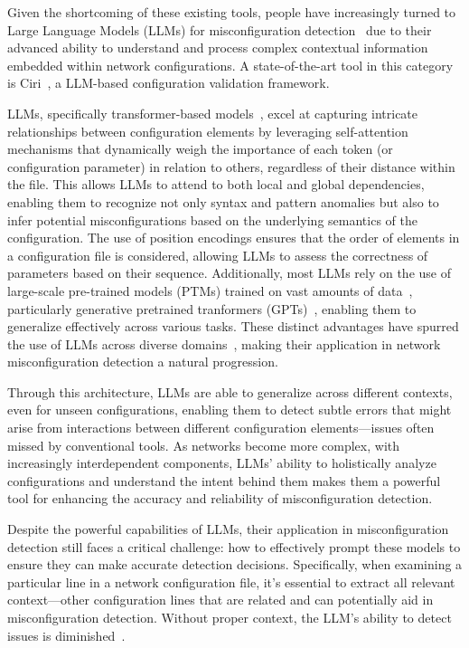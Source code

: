 Given the shortcoming of these existing tools,
people have increasingly turned to Large Language Models (LLMs) for misconfiguration detection~\cite{bogdanov2024leveraging,chen2024automatic,wang2024identifying,liu2024large, wang2024netconfeval} due to their advanced ability to understand and process complex contextual information embedded within network configurations. A state-of-the-art tool in this category is Ciri~\cite{lian2023configuration}, a LLM-based configuration validation framework.

LLMs, specifically transformer-based models~\cite{vaswani2017attention,hill2024transformers,lin2022survey}, excel at capturing intricate relationships between configuration elements by leveraging self-attention mechanisms that dynamically weigh the importance of each token (or configuration parameter) in relation to others, regardless of their distance within the file. This allows LLMs to attend to both local and global dependencies, enabling them to recognize not only syntax and pattern anomalies but also to infer potential misconfigurations based on the underlying semantics of the configuration. The use of position encodings ensures that the order of elements in a configuration file is considered, allowing LLMs to assess the correctness of parameters based on their sequence. Additionally, most LLMs rely on the use of large-scale pre-trained models (PTMs) trained on vast amounts of data~\cite{qiu2020pre}, particularly generative pretrained tranformers (GPTs)~\cite{achiam2023gpt,touvron2023llama,shanahan2024talking,taylor2023galactica,brown2020language,chowdhery2023palm}, enabling them to generalize effectively across various tasks.
These distinct advantages have spurred the use of LLMs across diverse domains~\cite{carion2020end,sheng2019nrtr,neil2020transformers,parmar2018image,chen2021developing,gulati2020conformer}, making their application in network misconfiguration detection a natural progression.

Through this architecture, LLMs are able to generalize across different contexts, even for unseen configurations, enabling them to detect subtle errors that might arise from interactions between different configuration elements—issues often missed by conventional tools. As networks become more complex, with increasingly interdependent components, LLMs' ability to holistically analyze configurations and understand the intent behind them makes them a powerful tool for enhancing the accuracy and reliability of misconfiguration detection.


Despite the powerful capabilities of LLMs, their application in misconfiguration detection still faces a critical challenge: how to effectively prompt these models to ensure they can make accurate detection decisions. Specifically, when examining a particular line in a network configuration file, it’s essential to extract all relevant context—other configuration lines that are related and can potentially aid in misconfiguration detection. Without proper context, the LLM’s ability to detect issues is diminished~\cite{liskavets2024prompt,tian2024examining,khurana2024and, shvartzshnaider2024llm}.

